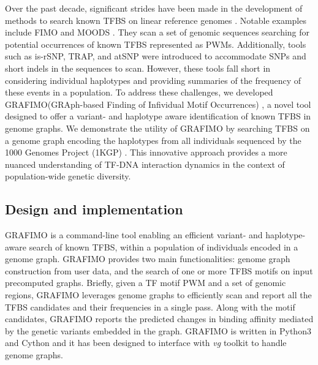 \documentclass[a4paper, titlepage, openright]{book}
\newcommand{\grafimo}{GRAFIMO\xspace}
\begin{document}
Over the past decade, significant strides have been made in the development of methods to search known TFBS on linear reference genomes \citep{tognon2023survey, boeva2016analysis}. Notable examples include FIMO \citep{grant2011fimo} and MOODS \citep{korhonen2009moods}. They scan a set of genomic sequences searching for potential occurrences of known TFBS represented as PWMs. Additionally, tools such as is-rSNP, TRAP, and atSNP \citep{macintyre2010rsnp, thomas2011transcription, zuo2015atsnp} were introduced to accommodate SNPs and short indels in the sequences to scan. However, these tools fall short in considering individual haplotypes and providing summaries of the frequency of these events in a population. To address these challenges, we developed \grafimo (GRAph-based Finding of Infividual Motif Occurrences) \citep{tognon2021grafimo}, a novel tool designed to offer a variant- and haplotype aware identification of known TFBS in genome graphs. We demonstrate the utility of \grafimo by searching TFBS on a genome graph encoding the haplotypes from all individuals sequenced by the 1000 Genomes Project (1KGP) \citep{siva20081000, zheng2017alignment}. This innovative approach provides a more nuanced understanding of TF-DNA interaction dynamics in the context of population-wide genetic diversity.

\subsection{Design and implementation}
\grafimo is a command-line tool enabling an efficient variant- and haplotype-aware search of known TFBS, within a population of individuals encoded in a genome graph. \grafimo provides two main functionalities: genome graph construction from user data, and the search of one or more TFBS motifs on input precomputed graphs. Briefly, given a TF motif PWM and a set of genomic regions, \grafimo leverages genome graphs to efficiently scan and report all the TFBS candidates and their frequencies in a single pass. Along with the motif candidates, \grafimo reports the predicted changes in binding affinity mediated by the genetic variants embedded in the graph. \grafimo is written in Python3 and Cython and it has been designed to interface with \emph{vg} toolkit to handle genome graphs.

\end{document}
